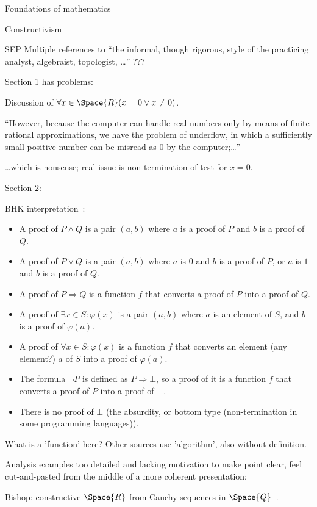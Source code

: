 \begin{plSection}{Foundations of mathematics}
\begin{plSection}{Constructivism}
\begin{plSection}{SEP}
Multiple references to ``the informal, though rigorous, 
style of the practicing analyst, algebraist, topologist, \ldots''
???

Section 1 has problems:

Discussion of
$ \forall x \in \Space{R} (x = 0 \vee x \ne 0)$.

``However, because the computer can handle real numbers 
only by means of finite rational approximations, 
we have the problem of underflow, 
in which a sufficiently small positive number can be misread as 0 
by the computer;\ldots''

\ldots which is nonsense;
real issue is non-termination of test for $x=0$.

Section 2:

BHK interpretation~\cite{wiki:BrouwerHeytingKolmogorovInterpretation}:
\begin{itemize}
  \item A proof of $P\wedge Q$ 
  is a pair $(a,b)$ where $a$ is a proof of $P$ 
  and $b$ is a proof of $Q$.
\item A proof of $P\vee Q$ is a pair $(a,b)$ 
where $a$ is $0$ and 
$b$ is a proof of $P$, 
or $a$ is $1$ 
and $b$ is a proof of $Q$.
\item A proof of $P\Rightarrow Q$ is 
a function $f$ that converts 
a proof of $P$ into a proof of $Q$.
\item A proof of $\exists x\in S:\varphi (x)$ is 
a pair $(a,b)$ where 
$a$ is an element of $S$, 
and $b$ is a proof of $\varphi (a)$.
\item A proof of $\forall x\in S:\varphi (x)$ is 
a function $f$ that converts 
an element (any element?) $a$ of $S$ into a proof of $\varphi (a)$.
\item The formula $\neg P$ is defined as $P\Rightarrow \bot$, 
so a proof of it is a function $f$ that converts 
a proof of $P$ into a proof of $\bot$.
\item There is no proof of $\bot$
(the absurdity, or bottom type 
(non-termination in some programming languages)).
\end{itemize}
What is a 'function' here? 
Other sources use 'algorithm', also without definition.

Analysis examples too detailed and lacking motivation 
to make point clear, feel cut-and-pasted from the middle
of a more coherent presentation:

Bishop: constructive $\Space{R}$ 
from Cauchy sequences 
in $\Space{Q}$~\cite{BishopBridges:1985:ConstructiveAnalysis}.


\end{plSection}
\end{plSection}
\end{plSection}
